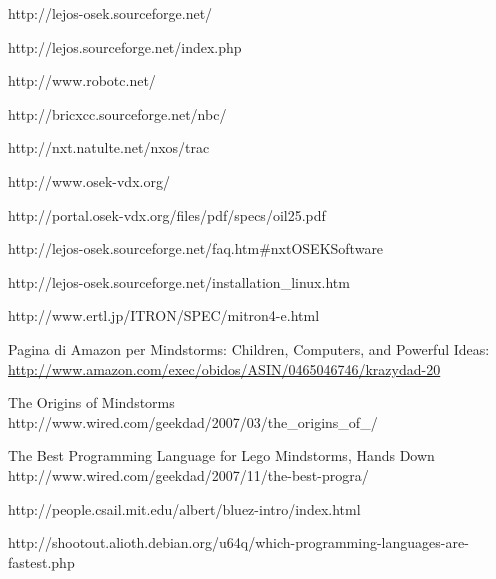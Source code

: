 \begin{thebibliography}{99}

            {http://lejos-osek.sourceforge.net/}

            {http://lejos.sourceforge.net/index.php}

            {http://www.robotc.net/}

            {http://bricxcc.sourceforge.net/nbc/}

            {http://nxt.natulte.net/nxos/trac}

            {http://www.osek-vdx.org/}

            {http://portal.osek-vdx.org/files/pdf/specs/oil25.pdf}

            {http://lejos-osek.sourceforge.net/faq.htm\#nxtOSEKSoftware}

            {http://lejos-osek.sourceforge.net/installation_linux.htm}

            {http://www.ertl.jp/ITRON/SPEC/mitron4-e.html}

    Pagina di Amazon per Mindstorms: Children, Computers, and Powerful
    Ideas: \\
    \url{http://www.amazon.com/exec/obidos/ASIN/0465046746/krazydad-20}

          {The Origins of Mindstorms}
          {http://www.wired.com/geekdad/2007/03/the_origins_of_/}

          {The Best Programming Language for Lego Mindstorms, Hands Down}
          {http://www.wired.com/geekdad/2007/11/the-best-progra/}

        {http://people.csail.mit.edu/albert/bluez-intro/index.html}

        {http://shootout.alioth.debian.org/u64q/which-programming-languages-are-fastest.php}
        

\end{thebibliography}
